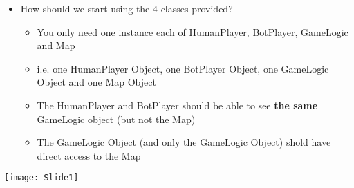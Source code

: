 \documentclass{beamer}
\begin{document}
\begin{frame}
\begin{itemize}
\item How should we start using the 4 classes provided?
\begin{itemize}
\item You only need one instance each of HumanPlayer, BotPlayer, GameLogic and Map
\item i.e. one HumanPlayer Object, one BotPlayer Object, one GameLogic Object and one Map Object
\item The HumanPlayer and BotPlayer should be able to see \textbf{the same} GameLogic object (but not the Map)
\item The GameLogic Object (and only the GameLogic Object) shold have direct access to the Map
\end{itemize}
\end{itemize}
\end{frame}

\begin{frame}[fragile]
\texttt{[image: Slide1]}
\end{frame}
\end{document}
